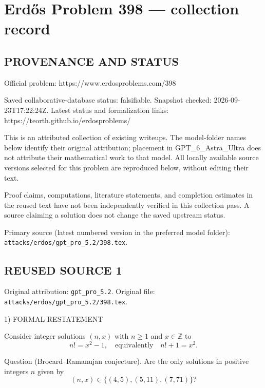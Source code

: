 \section*{Erd\H{o}s Problem 398 --- collection record}

\subsection*{PROVENANCE AND STATUS}
Official problem: https://www.erdosproblems.com/398

Saved collaborative-database status: falsifiable.
Snapshot checked: 2026-09-23T17:22:24Z.
Latest status and formalization links: https://teorth.github.io/erdosproblems/

This is an attributed collection of existing writeups. The model-folder names below identify their original attribution; placement in GPT\_6\_Astra\_Ultra does not attribute their mathematical work to that model. All locally available source versions selected for this problem are reproduced below, without editing their text.

Proof claims, computations, literature statements, and completion estimates in the reused text have not been independently verified in this collection pass. A source claiming a solution does not change the saved upstream status.

Primary source (latest numbered version in the preferred model folder): \texttt{attacks/erdos/gpt\_pro\_5.2/398.tex}.

\subsection*{REUSED SOURCE 1}
Original attribution: \texttt{gpt\_pro\_5.2}.
Original file: \texttt{attacks/erdos/gpt\_pro\_5.2/398.tex}.


1) FORMAL RESTATEMENT

Consider integer solutions $(n,x)$ with $n\ge 1$ and $x\in\mathbb Z$ to
\[
 n! = x^2 - 1,\quad\text{equivalently}\quad n!+1=x^2.
\]

Question (Brocard--Ramanujan conjecture).
Are the only solutions in positive integers $n$ given by
\[
(n,x)\in\{(4,5),(5,11),(7,71)\}?
\]

